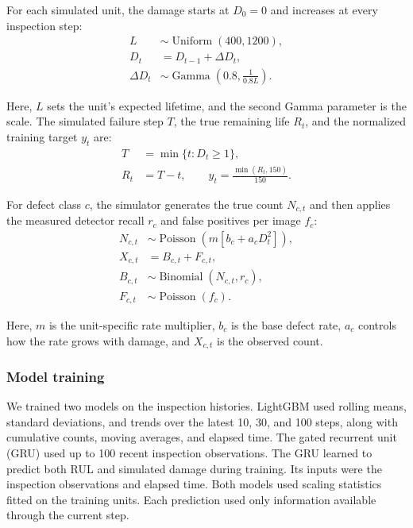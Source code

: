 \documentclass[conference]{IEEEtran}
\begin{document}
For each simulated unit, the damage starts at \(D_0=0\) and increases at every inspection step:
\begin{equation}
\begin{aligned}
L &\sim \operatorname{Uniform}(400,1200),\\
D_t &= D_{t-1}+\Delta D_t,\\
\Delta D_t &\sim \operatorname{Gamma}\!\left(0.8,\frac{1}{0.8L}\right).
\end{aligned}
\end{equation}

Here, \(L\) sets the unit's expected lifetime, and the second Gamma parameter is the scale. The simulated failure step \(T\), the true remaining life \(R_t\), and the normalized training target \(y_t\) are:
\begin{equation}
\begin{aligned}
T &= \min\{t:D_t\geq 1\},\\
R_t &= T-t,\qquad
y_t = \frac{\min(R_t,150)}{150}.
\end{aligned}
\end{equation}

For defect class \(c\), the simulator generates the true count \(N_{c,t}\) and then applies the measured detector recall \(r_c\) and false positives per image \(f_c\):
\begin{equation}
\begin{aligned}
N_{c,t}&\sim\operatorname{Poisson}\!\left(m[b_c+a_cD_t^2]\right),\\
X_{c,t}&=B_{c,t}+F_{c,t},\\
B_{c,t}&\sim\operatorname{Binomial}(N_{c,t},r_c),\\
F_{c,t}&\sim\operatorname{Poisson}(f_c).
\end{aligned}
\end{equation}

Here, \(m\) is the unit-specific rate multiplier, \(b_c\) is the base defect rate, \(a_c\) controls how the rate grows with damage, and \(X_{c,t}\) is the observed count.

\subsubsection{Model training}

We trained two models on the inspection histories. LightGBM used rolling means, standard deviations, and trends over the latest 10, 30, and 100 steps, along with cumulative counts, moving averages, and elapsed time. The gated recurrent unit (GRU) used up to 100 recent inspection observations. The GRU learned to predict both RUL and simulated damage during training. Its inputs were the inspection observations and elapsed time. Both models used scaling statistics fitted on the training units. Each prediction used only information available through the current step.
\end{document}
